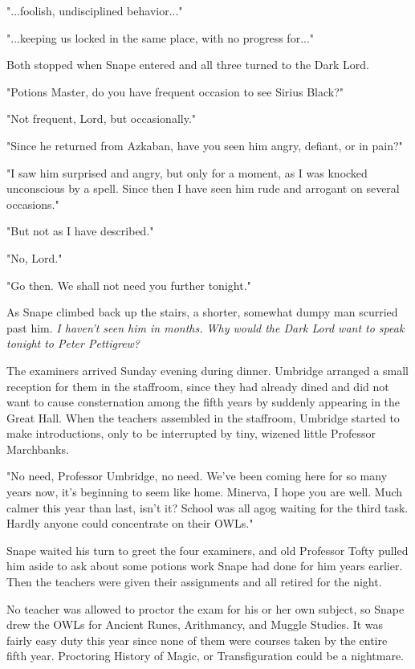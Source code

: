 "...foolish, undisciplined behavior..."

"...keeping us locked in the same place, with no progress for..."

Both stopped when Snape entered and all three turned to the Dark Lord.

"Potions Master, do you have frequent occasion to see Sirius Black?"

"Not frequent, Lord, but occasionally."

"Since he returned from Azkaban, have you seen him angry, defiant, or in pain?"

"I saw him surprised and angry, but only for a moment, as I was knocked unconscious by a spell. Since then I have seen him rude and arrogant on several occasions."

"But not as I have described."

"No, Lord."

"Go then. We shall not need you further tonight."

As Snape climbed back up the stairs, a shorter, somewhat dumpy man scurried past him. \emph{I haven't seen him in months. Why would the Dark Lord want to speak tonight to Peter Pettigrew?}

The examiners arrived Sunday evening during dinner. Umbridge arranged a small reception for them in the staffroom, since they had already dined and did not want to cause consternation among the fifth years by suddenly appearing in the Great Hall. When the teachers assembled in the staffroom, Umbridge started to make introductions, only to be interrupted by tiny, wizened little Professor Marchbanks.

"No need, Professor Umbridge, no need. We've been coming here for so many years now, it's beginning to seem like home. Minerva, I hope you are well. Much calmer this year than last, isn't it? School was all agog waiting for the third task. Hardly anyone could concentrate on their OWLs."

Snape waited his turn to greet the four examiners, and old Professor Tofty pulled him aside to ask about some potions work Snape had done for him years earlier. Then the teachers were given their assignments and all retired for the night.

No teacher was allowed to proctor the exam for his or her own subject, so Snape drew the OWLs for Ancient Runes, Arithmancy, and Muggle Studies. It was fairly easy duty this year since none of them were courses taken by the entire fifth year. Proctoring History of Magic, or Transfiguration could be a nightmare.

